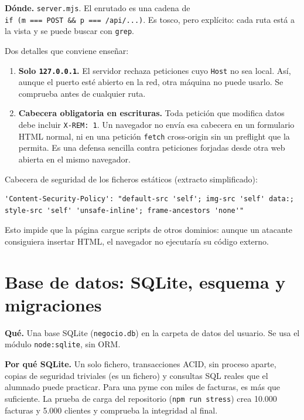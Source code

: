 \textbf{Dónde.} \texttt{server.mjs}. El enrutado es una cadena de \texttt{if\ (m\ ===\ \textquotesingle{}POST\textquotesingle{}\ \&\&\ p\ ===\ \textquotesingle{}/api/...\textquotesingle{})}. Es tosco, pero explícito: cada ruta está a la vista y se puede buscar con \texttt{grep}.

Dos detalles que conviene enseñar:

\begin{enumerate}
\def\labelenumi{\arabic{enumi}.}
\tightlist
\item
  \textbf{Solo \texttt{127.0.0.1}.} El servidor rechaza peticiones cuyo \texttt{Host} no sea local. Así, aunque el puerto esté abierto en la red, otra máquina no puede usarlo. Se comprueba antes de cualquier ruta.
\item
  \textbf{Cabecera obligatoria en escrituras.} Toda petición que modifica datos debe incluir \texttt{X-REM:\ 1}. Un navegador no envía esa cabecera en un formulario HTML normal, ni en una petición \texttt{fetch} cross-origin sin un preflight que la permita. Es una defensa sencilla contra peticiones forjadas desde otra web abierta en el mismo navegador.
\end{enumerate}

Cabecera de seguridad de los ficheros estáticos (extracto simplificado):

\begin{verbatim}
'Content-Security-Policy': "default-src 'self'; img-src 'self' data:; style-src 'self' 'unsafe-inline'; frame-ancestors 'none'"
\end{verbatim}

Esto impide que la página cargue scripts de otros dominios: aunque un atacante consiguiera insertar HTML, el navegador no ejecutaría su código externo.

\chapter{Base de datos: SQLite, esquema y migraciones}\label{cap:bbdd}\label{base-de-datos-sqlite-esquema-y-migraciones}

\textbf{Qué.} Una base SQLite (\texttt{negocio.db}) en la carpeta de datos del usuario. Se usa el módulo \texttt{node:sqlite}, sin ORM.

\textbf{Por qué SQLite.} Un solo fichero, transacciones ACID, sin proceso aparte, copias de seguridad triviales (es un fichero) y consultas SQL reales que el alumnado puede practicar. Para una pyme con miles de facturas, es más que suficiente. La prueba de carga del repositorio (\texttt{npm\ run\ stress}) crea 10.000 facturas y 5.000 clientes y comprueba la integridad al final.

